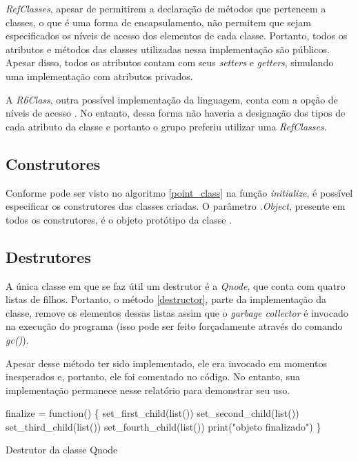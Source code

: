 \documentclass[rel_mlp]{iiufrgs}
\makeatletter
\newcommand{\nosemic}{\renewcommand{\@endalgocfline}{\relax}}%
\makeatother
\begin{document}
 \textit{RefClasses}, apesar de permitirem a declaração de métodos que pertencem a classes, o que é uma
 forma de encapsulamento, não permitem que sejam especificados os níveis de acesso dos elementos de cada
 classe. Portanto, todos os atributos e métodos das classes utilizadas nessa implementação são públicos.
 Apesar disso, todos os atributos contam com seus \textit{setters} e \textit{getters}, simulando uma
 implementação com atributos privados.

 A \textit{R6Class}, outra possível implementação da linguagem, conta com a opção de níveis de acesso \cite{R6}.
 No entanto, dessa forma não haveria a designação dos tipos de cada atributo da classe e portanto o grupo
 preferiu utilizar uma \textit{RefClasses}.

\subsection{Construtores}

    Conforme pode ser visto no algoritmo \ref{point_class} na função \textit{initialize}, é possível
    especificar os construtores das classes criadas. O parâmetro \textit{.Object}, presente em todos
    os construtores, é o objeto protótipo da classe \cite{init_meth}.

\subsection{Destrutores}

    A única classe em que se faz útil um destrutor é a \textit{Qnode}, que conta com quatro listas
    de filhos. Portanto, o método \ref{destructor}, parte da implementação da classe, remove os elementos dessas listas assim que o
    \textit{garbage collector} é invocado na execução do programa (isso pode ser feito forçadamente
    através do comando \textit{gc()}).

    Apesar desse método ter sido implementado, ele era invocado em momentos inesperados e, portanto, ele foi
    comentado no código. No entanto, sua implementação permanece nesse relatório para demonstrar seu uso.

\begin{algorithm}
\label{destructor}
  \nosemic finalize = function() {\{} \;
 \nosemic set{\_}first{\_}child(list()) \;
  \nosemic set{\_}second{\_}child(list()) \;
  \nosemic set{\_}third{\_}child(list()) \;
 \nosemic set{\_}fourth{\_}child(list()) \;
  \nosemic print("objeto finalizado") \;
  \nosemic {\}} \;
  \caption{Destrutor da classe Qnode}
  \end{algorithm}
\end{document}

